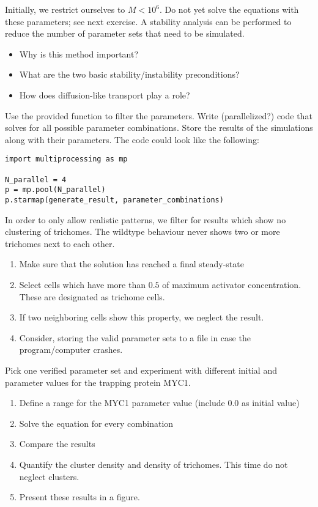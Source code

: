 Initially, we restrict ourselves to $M<10^6$.
Do not yet solve the equations with these parameters; see next exercise.
%
%
A stability analysis can be performed to reduce the number of parameter sets that need to be simulated.
\begin{itemize}
    \item Why is this method important?
    \item What are the two basic stability/instability preconditions?
    \item How does diffusion-like transport play a role?
\end{itemize}
Use the provided function to filter the parameters.
%
%
Write (parallelized?) code that solves for all possible parameter combinations.
Store the results of the simulations along with their parameters.
The code could look like the following:
\begin{verbatim}
import multiprocessing as mp

N_parallel = 4
p = mp.pool(N_parallel)
p.starmap(generate_result, parameter_combinations)
\end{verbatim}
%
%
In order to only allow realistic patterns, we filter for results which show no clustering of trichomes.
The wildtype behaviour never shows two or more trichomes next to each other.
\begin{enumerate}
    \item Make sure that the solution has reached a final steady-state
    \item Select cells which have more than $0.5$ of maximum activator concentration.
    These are designated as trichome cells.
    \item If two neighboring cells show this property, we neglect the result.
    \item Consider, storing the valid parameter sets to a file in case the program/computer crashes.   
\end{enumerate}
%
%
Pick one verified parameter set and experiment with different initial and parameter values for the trapping protein MYC1.
\begin{enumerate}
    \item Define a range for the MYC1 parameter value (include $0.0$ as initial value)
    \item Solve the equation for every combination
    \item Compare the results
    \item Quantify the cluster density and density of trichomes.
    This time do not neglect clusters.
    \item Present these results in a figure.
\end{enumerate}
%
%
